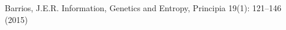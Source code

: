 \documentclass[
12pt,		%
openright,	%
twoside,  %
a4paper,			%
chapter=TITLE,		%
english,			%
french,				%
spanish,			%
brazil				%
]{USPSC-classe/USPSC}
\begin{document}
\begin{flushleft}
\begin{flushleft}
\begin{flushleft}
\begin{flushleft}
\begin{flushleft}
\begin{flushleft}
\begin{flushleft}
\begin{flushleft}
\begin{flushleft}
\begin{flushleft}
[Barrios, 2015] Barrios, J.E.R. Information, Genetics and Entropy, Principia 19(1): 121–146 (2015)
\end{flushleft}


\end{flushleft}


\end{flushleft}


\end{flushleft}


\end{flushleft}


\end{flushleft}


\end{flushleft}


\end{flushleft}


\end{flushleft}


\end{flushleft}
\end{document}
